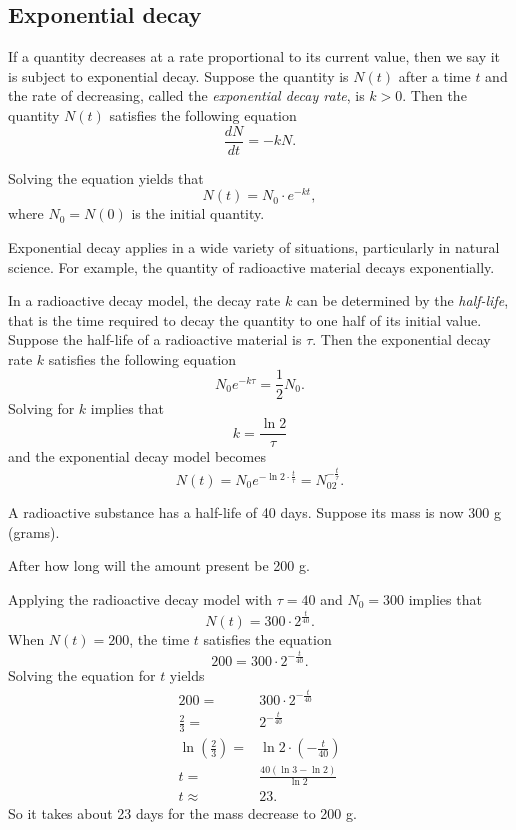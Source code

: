 \subsection{Exponential decay}

If a quantity decreases at a rate proportional to its current value, then we say it is subject to exponential decay. Suppose the quantity is $N(t)$ after a time $t$ and the rate of decreasing, called the \emph{exponential decay rate}, is $k>0$. Then the quantity $N(t)$ satisfies the following equation
\[{\frac {dN}{dt}}=-k N.\]

Solving the equation yields that
\[N(t)=N_0\cdot e^{-kt},\]
where $N_0=N(0)$ is the initial quantity.

Exponential decay applies in a wide variety of situations, particularly in natural science. For example, the quantity of radioactive material decays exponentially.

In a radioactive decay model, the decay rate $k$ can be determined by the \emph{half-life}, that is the time required to decay the quantity to one half of its initial value. Suppose the half-life of a radioactive material is $\tau$. Then the exponential decay rate $k$ satisfies the following equation
\[N_0e^{-k\tau}=\frac12N_0.\]
Solving for $k$ implies that
\[k=\frac{\ln2}{\tau}\]
and the exponential decay model becomes
\[N(t)=N_0e^{-\ln 2\cdot\frac{t}{\tau}}=N_02^{-\frac{t}{\tau}}.\]

\begin{example}
  A radioactive substance has a half-life of 40 days. Suppose its mass is now 300 g (grams).
  
  After how long will the amount present be 200 g.
\end{example}
\begin{solution}
  Applying the radioactive decay model with $\tau=40$ and $N_0=300$ implies that
  \[N(t)=300\cdot 2^{\frac{t}{40}}.\]
  When $N(t)=200$, the time $t$ satisfies the equation
  \[200=300\cdot 2^{-\frac{t}{40}}.\]
  Solving the equation for $t$ yields
  \[\begin{aligned}
    200=&300\cdot 2^{-\frac{t}{40}}\\
    \frac{2}{3}=&2^{-\frac{t}{40}}\\
    \ln\left(\frac{2}{3}\right)=&\ln2\cdot\left(-\frac{t}{40}\right)\\
    t=&\frac{40(\ln3-\ln2)}{\ln2}\\
    t\approx & 23.
  \end{aligned}\]
  So it takes about 23 days for the mass decrease to 200 g.
\end{solution}

